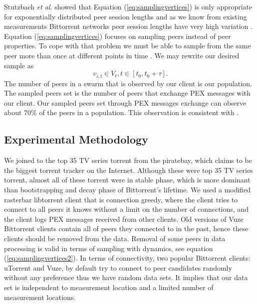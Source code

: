 \documentclass[10pt,conference,letterpaper,final]{IEEEtran}
\begin{document}
Stutzbach \textit{et al}. \cite{stutzbach2007sampling} showed that  Equation (\ref{eq:samplingvertices}) is only appropriate for exponentially distributed  peer session lengths and as we know from existing measurements Bittorrent networks peer session lengths have very high variation \cite{guo2005measurements}.  
Equation (\ref{eq:samplingvertices}) focuses on sampling peers instead of peer properties. 
To cope with that problem we must be able to sample from the same peer more than once at different points in time \cite{stutzbach2007sampling}. 
We may rewrite our desired sample as
\begin{equation}
\ v_{i,t} \in V_t  , t \in [t_0, t_0 + \tau].
\label{eq:samplingvertices2}
\end{equation}
The number of peers in a swarm that is observed by our client is our population. 
The sampled peers set is the number of peers that exchange PEX messages with our client.
Our sampled peers set through PEX messages exchange can observe about $70\%$ of the peers in a population.
This observation is consistent with \cite{wu2010understanding}.

\subsection{Experimental Methodology}
We joined to the top 35 TV series torrent from the piratebay, which claims to be the biggest torrent tracker on the Internet.
Although these were top 35 TV series torrent, almost all of these torrent were in stable phase, which is more dominant than bootstrapping and decay phase of Bittorrent's lifetime.
We used a modified rasterbar libtorrent \cite{rasterbar} client that is connection greedy, where the client tries to connect to all peers it knows without a limit on the number of connections, and the client logs PEX messages received from other clients.
Old versions of Vuze Bittorrent clients contain all of peers they connected to in the past, hence these clients should be removed from the data.
Removal of some peers in data processing is valid in terms of sampling with dynamics, see equation (\ref{eq:samplingvertices2}).
In terms of connectivity, two popular Bittorrent clients: uTorrent and Vuze, by default try to connect to peer candidates randomly without any preference thus we have random data sets.
It implies that our data set is independent to measurement location and a limited number of measurement locations.
\end{document}
